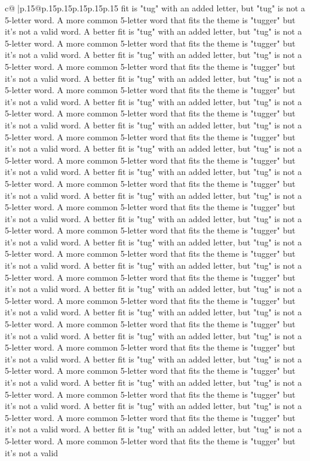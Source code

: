 \documentclass{article}
\begin{document}
{\begin{supertabular}{c@{$\;$}|p{.15\linewidth}@{}p{.15\linewidth}p{.15\linewidth}p{.15\linewidth}p{.15\linewidth}p{.15\linewidth}}
{{{fit is "tug" with an added letter, but "tug" is not a 5{-}letter word. A more common 5{-}letter word that fits the theme is "tugger" but it's not a valid word. A better fit is "tug" with an added letter, but "tug" is not a 5{-}letter word. A more common 5{-}letter word that fits the theme is "tugger" but it's not a valid word. A better fit is "tug" with an added letter, but "tug" is not a 5{-}letter word. A more common 5{-}letter word that fits the theme is "tugger" but it's not a valid word. A better fit is "tug" with an added letter, but "tug" is not a 5{-}letter word. A more common 5{-}letter word that fits the theme is "tugger" but it's not a valid word. A better fit is "tug" with an added letter, but "tug" is not a 5{-}letter word. A more common 5{-}letter word that fits the theme is "tugger" but it's not a valid word. A better fit is "tug" with an added letter, but "tug" is not a 5{-}letter word. A more common 5{-}letter word that fits the theme is "tugger" but it's not a valid word. A better fit is "tug" with an added letter, but "tug" is not a 5{-}letter word. A more common 5{-}letter word that fits the theme is "tugger" but it's not a valid word. A better fit is "tug" with an added letter, but "tug" is not a 5{-}letter word. A more common 5{-}letter word that fits the theme is "tugger" but it's not a valid word. A better fit is "tug" with an added letter, but "tug" is not a 5{-}letter word. A more common 5{-}letter word that fits the theme is "tugger" but it's not a valid word. A better fit is "tug" with an added letter, but "tug" is not a 5{-}letter word. A more common 5{-}letter word that fits the theme is "tugger" but it's not a valid word. A better fit is "tug" with an added letter, but "tug" is not a 5{-}letter word. A more common 5{-}letter word that fits the theme is "tugger" but it's not a valid word. A better fit is "tug" with an added letter, but "tug" is not a 5{-}letter word. A more common 5{-}letter word that fits the theme is "tugger" but it's not a valid word. A better fit is "tug" with an added letter, but "tug" is not a 5{-}letter word. A more common 5{-}letter word that fits the theme is "tugger" but it's not a valid word. A better fit is "tug" with an added letter, but "tug" is not a 5{-}letter word. A more common 5{-}letter word that fits the theme is "tugger" but it's not a valid word. A better fit is "tug" with an added letter, but "tug" is not a 5{-}letter word. A more common 5{-}letter word that fits the theme is "tugger" but it's not a valid word. A better fit is "tug" with an added letter, but "tug" is not a 5{-}letter word. A more common 5{-}letter word that fits the theme is "tugger" but it's not a valid word. A better fit is "tug" with an added letter, but "tug" is not a 5{-}letter word. A more common 5{-}letter word that fits the theme is "tugger" but it's not a valid word. A better fit is "tug" with an added letter, but "tug" is not a 5{-}letter word. A more common 5{-}letter word that fits the theme is "tugger" but it's not a valid word. A better fit is "tug" with an added letter, but "tug" is not a 5{-}letter word. A more common 5{-}letter word that fits the theme is "tugger" but it's not a valid }}}
\end{supertabular}}
\end{document}
